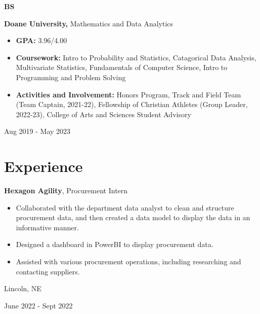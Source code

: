 \documentclass[10pt, letterpaper]{article}
\newenvironment{highlights}{
    \begin{itemize}[
        topsep=0.10 cm,
        parsep=0.10 cm,
        partopsep=0pt,
        itemsep=0pt,
        leftmargin=0.4 cm + 10pt
    ]
}{
    \end{itemize}
} %
\newenvironment{twocolentry}[2][]{
    \onecolentry
    \def\secondColumn{#2}
    \setcolumnwidth{\fill, 4.5 cm}
    \begin{paracol}{2}
}{
    \switchcolumn \raggedleft \secondColumn
    \end{paracol}
    \endonecolentry
} %
\newenvironment{threecolentry}[3][]{
    \onecolentry
    \def\thirdColumn{#3}
    \setcolumnwidth{1 cm, \fill, 4.5 cm}
    \begin{paracol}{3}
    {\raggedright #2} \switchcolumn
}{
    \switchcolumn \raggedleft \thirdColumn
    \end{paracol}
    \endonecolentry
} %
\begin{document}
        \vspace{0.2 cm}

                \begin{threecolentry}{\textbf{BS}}{
            Aug 2019 - May 2023
        }
            \textbf{Doane University, }Mathematics and Data Analytics
            \begin{highlights}
                \item \textbf{GPA:} 3.96/4.00
                \item \textbf{Coursework:} Intro to Probability and Statistics, Catagorical Data Analysis, Multivariate Statistics, Fundamentals of Computer Science, Intro to Programming and Problem Solving
                \item \textbf{Activities and Involvement:} Honors Program, Track and Field Team (Team Captain, 2021-22), Fellowship of Christian Athletes (Group Leader, 2022-23), College of Arts and Sciences Student Advisory
            \end{highlights}
        \end{threecolentry}


    
    \section{Experience}



        
        \begin{twocolentry}{
            Lincoln, NE

        June 2022 - Sept 2022
        }
            \textbf{Hexagon Agility}, Procurement Intern
            \begin{highlights}
                \item Collaborated with the department data analyst to clean and structure procurement data, and then created a data model to display the data in an informative manner.
                \item Designed a dashboard in PowerBI to display procurement data.
                \item Assisted with various procurement operations, including researching and contacting suppliers.
            \end{highlights}
        \end{twocolentry}


        \vspace{0.2 cm}
\end{document}
